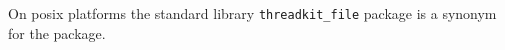 
On posix platforms the standard library {\tt threadkit\_file} package is a synonym for 
the  package.

